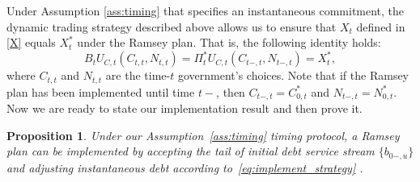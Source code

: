 \documentclass[12pt]{article}
\newtheorem{proposition}{Proposition}
\begin{document}
Under Assumption \ref{ass:timing} that specifies  an instantaneous commitment,  the dynamic trading strategy described above allows us to ensure that  $X_t$  defined in \eqref{X} equals $X_t^\ast$  under the Ramsey plan. That is, 
the following identity holds:
\begin{equation} \label{key5} 
{B}_tU_{C, t}(C_{t, t}, N_{t, t})=\Pi_t^* U_{C, t}(C_{t-, t}, N_{t-, t}) = X_t^*,   \end{equation}  
where $C_{t, t}$ and $N_{t, t}   $
are the time-$t$ government's choices.  
Note that if the Ramsey plan has been  implemented  until time $t-$, then $C_{t-, t}=C_{0, t}^*$ and $N_{t-,t}=N_{0,t}^*$. Now we are ready to state  our  implementation result and then  prove it. 
\begin{proposition}\label{propimplement}
	Under our Assumption~\ref{ass:timing} timing protocol, a Ramsey plan can be implemented by accepting the tail of  initial debt service stream  $\{b_{0-,u}\}$ and adjusting instantaneous debt according to~\eqref{eq:implement_strategy} .
\end{proposition}
\end{document}
